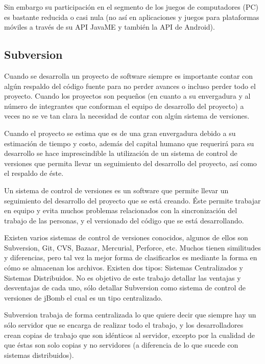 \documentclass[a4paper,12pt,openany,oneside]{book}
\begin{document}
Sin embargo su participación en el segmento de los juegos de computadores (PC) es bastante reducida o casi nula (no así en aplicaciones y juegos para plataformas móviles a través de su API JavaME y también la API de Android).
\subsection{Subversion}
Cuando se desarrolla un proyecto de software siempre es importante contar con algún respaldo del código fuente para no perder avances o incluso perder todo el proyecto. Cuando los proyectos son pequeños (en cuanto a su envergadura y al número de integrantes que conforman el equipo de desarrollo del proyecto) a veces no se ve tan clara la necesidad de contar con algún sistema de versiones.

Cuando el proyecto se estima que es de una gran envergadura debido a su estimación de tiempo y costo, además del capital humano que requerirá para su desarrollo se hace imprescindible la utilización de un sistema de control de versiones que permita llevar un seguimiento del desarrollo del proyecto, así como el respaldo de éste.

Un sistema de control de versiones es un software que permite llevar un seguimiento del desarrollo del proyecto que se está creando. Éste permite trabajar en equipo y evita muchos problemas relacionados con la sincronización del trabajo de las personas, y el versionado del código que se está desarrollando.

Existen varios sistemas de control de versiones conocidos, algunos de ellos son Subversion, Git, CVS, Bazaar, Mercurial, Perforce, etc. Muchos tienen similitudes y diferencias, pero tal vez la mejor forma de clasificarlos es mediante la forma en cómo se almacenan los archivos. Existen dos tipos: Sistemas Centralizados y Sistemas Distribuidos. No es objetivo de este trabajo detallar las ventajas y desventajas de cada uno, sólo detallar Subversion como sistema de control de versiones de jBomb el cual es un tipo centralizado.

Subversion trabaja de forma centralizada lo que quiere decir que siempre hay un sólo servidor que se encarga de realizar todo el trabajo, y los desarrolladores crean copias de trabajo que son idénticos al servidor, excepto por la cualidad de que éstas son solo copias y no servidores (a diferencia de lo que sucede con sistemas distribuidos).
\end{document}

